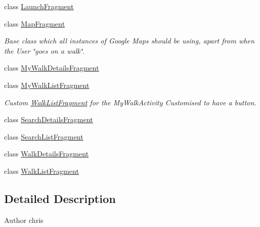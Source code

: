 \begin{DoxyCompactItemize}
\item 
class \hyperlink{classuk_1_1ac_1_1swan_1_1digitaltrails_1_1fragments_1_1_launch_fragment}{Launch\+Fragment}
\item 
class \hyperlink{classuk_1_1ac_1_1swan_1_1digitaltrails_1_1fragments_1_1_map_fragment}{Map\+Fragment}
\begin{DoxyCompactList}\small\item\em Base class which all instances of Google Maps should be using, apart from when the User \char`\"{}goes on a walk\char`\"{}. \end{DoxyCompactList}\item 
class \hyperlink{classuk_1_1ac_1_1swan_1_1digitaltrails_1_1fragments_1_1_my_walk_details_fragment}{My\+Walk\+Details\+Fragment}
\item 
class \hyperlink{classuk_1_1ac_1_1swan_1_1digitaltrails_1_1fragments_1_1_my_walk_list_fragment}{My\+Walk\+List\+Fragment}
\begin{DoxyCompactList}\small\item\em Custom \hyperlink{classuk_1_1ac_1_1swan_1_1digitaltrails_1_1fragments_1_1_walk_list_fragment}{Walk\+List\+Fragment} for the My\+Walk\+Activity Customised to have a button. \end{DoxyCompactList}\item 
class \hyperlink{classuk_1_1ac_1_1swan_1_1digitaltrails_1_1fragments_1_1_search_details_fragment}{Search\+Details\+Fragment}
\item 
class \hyperlink{classuk_1_1ac_1_1swan_1_1digitaltrails_1_1fragments_1_1_search_list_fragment}{Search\+List\+Fragment}
\item 
class \hyperlink{classuk_1_1ac_1_1swan_1_1digitaltrails_1_1fragments_1_1_walk_details_fragment}{Walk\+Details\+Fragment}
\item 
class \hyperlink{classuk_1_1ac_1_1swan_1_1digitaltrails_1_1fragments_1_1_walk_list_fragment}{Walk\+List\+Fragment}
\end{DoxyCompactItemize}


\subsection{Detailed Description}
\begin{DoxyAuthor}{Author}
chris 
\end{DoxyAuthor}
